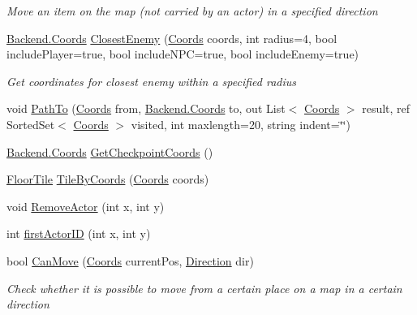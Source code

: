 \begin{DoxyCompactItemize}
\begin{DoxyCompactList}\small\item\em Move an item on the map (not carried by an actor) in a specified direction \end{DoxyCompactList}\item 
\hyperlink{class_gruppe22_1_1_backend_1_1_coords}{Backend.\-Coords} \hyperlink{class_gruppe22_1_1_backend_1_1_map_aedf8ea673120929f8ad213d12441cd46}{Closest\-Enemy} (\hyperlink{class_gruppe22_1_1_backend_1_1_coords}{Coords} coords, int radius=4, bool include\-Player=true, bool include\-N\-P\-C=true, bool include\-Enemy=true)
\begin{DoxyCompactList}\small\item\em Get coordinates for closest enemy within a specified radius \end{DoxyCompactList}\item 
void \hyperlink{class_gruppe22_1_1_backend_1_1_map_a81e7cdb072bbd70c12ec23c76ce0cc3a}{Path\-To} (\hyperlink{class_gruppe22_1_1_backend_1_1_coords}{Coords} from, \hyperlink{class_gruppe22_1_1_backend_1_1_coords}{Backend.\-Coords} to, out List$<$ \hyperlink{class_gruppe22_1_1_backend_1_1_coords}{Coords} $>$ result, ref Sorted\-Set$<$ \hyperlink{class_gruppe22_1_1_backend_1_1_coords}{Coords} $>$ visited, int maxlength=20, string indent=\char`\"{}\char`\"{})
\item 
\hyperlink{class_gruppe22_1_1_backend_1_1_coords}{Backend.\-Coords} \hyperlink{class_gruppe22_1_1_backend_1_1_map_a186008c8dbdf442c4753dcf9eace5b58}{Get\-Checkpoint\-Coords} ()
\item 
\hyperlink{class_gruppe22_1_1_backend_1_1_floor_tile}{Floor\-Tile} \hyperlink{class_gruppe22_1_1_backend_1_1_map_a6b3eb978a3e4230531ee1f23a0f511b4}{Tile\-By\-Coords} (\hyperlink{class_gruppe22_1_1_backend_1_1_coords}{Coords} coords)
\item 
void \hyperlink{class_gruppe22_1_1_backend_1_1_map_a0c7963e738e6441b87c75a62381d95fd}{Remove\-Actor} (int x, int y)
\item 
int \hyperlink{class_gruppe22_1_1_backend_1_1_map_a87cb732700403985727f2535ecc3f955}{first\-Actor\-I\-D} (int x, int y)
\item 
bool \hyperlink{class_gruppe22_1_1_backend_1_1_map_afd4780d14e0ebb8dbd087b0a5d6cfbb9}{Can\-Move} (\hyperlink{class_gruppe22_1_1_backend_1_1_coords}{Coords} current\-Pos, \hyperlink{namespace_gruppe22_1_1_backend_a2d53d5d14b8ea0951ba6971e5da1ebf5}{Direction} dir)
\begin{DoxyCompactList}\small\item\em Check whether it is possible to move from a certain place on a map in a certain direction \end{DoxyCompactList}\item 

\end{DoxyCompactItemize}
